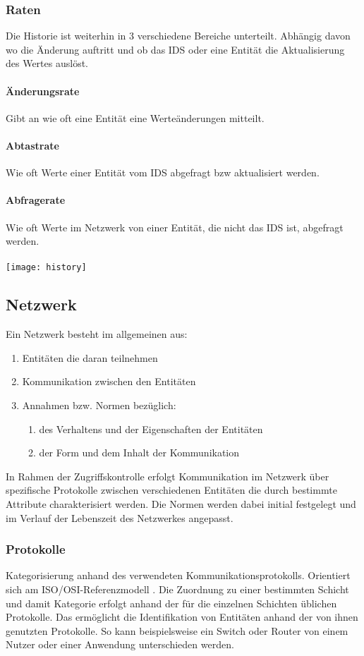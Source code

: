 \subsubsection{Raten}
Die Historie ist weiterhin in 3 verschiedene Bereiche unterteilt. Abhängig davon wo die Änderung auftritt und ob das IDS oder eine Entität die Aktualisierung des Wertes auslöst.
\paragraph{Änderungsrate} 
Gibt an wie oft eine Entität eine Werteänderungen mitteilt.
\paragraph{Abtastrate}
Wie oft Werte einer Entität vom IDS abgefragt bzw aktualisiert werden.
\paragraph{Abfragerate}
Wie oft Werte im Netzwerk von einer Entität, die nicht das IDS ist, abgefragt werden.\\\\
\texttt{[image: history]}
\pagebreak

\subsection{Netzwerk}
Ein Netzwerk besteht im allgemeinen aus:
\begin{enumerate}
\item{Entitäten die daran teilnehmen}
\item{Kommunikation zwischen den Entitäten}
\item{Annahmen bzw. Normen bezüglich:}
\begin{enumerate}
	\item{des Verhaltens und der Eigenschaften der Entitäten}
	\item{der Form und dem Inhalt der Kommunikation}
\end{enumerate}
\end{enumerate}
In Rahmen der Zugriffskontrolle erfolgt Kommunikation im Netzwerk über spezifische Protokolle zwischen verschiedenen Entitäten die durch bestimmte Attribute charakterisiert werden. Die Normen werden dabei initial festgelegt und im Verlauf der Lebenszeit des Netzwerkes angepasst.  
\subsubsection{Protokolle}
Kategorisierung anhand des verwendeten Kommunikationsprotokolls. Orientiert sich am ISO/OSI-Referenzmodell \cite{day1983osi}. Die Zuordnung zu einer bestimmten Schicht und damit Kategorie erfolgt anhand der für die einzelnen Schichten üblichen Protokolle. Das ermöglicht die Identifikation von Entitäten anhand der von ihnen genutzten Protokolle. So kann beispielsweise ein Switch oder Router von einem Nutzer oder einer Anwendung unterschieden werden.
